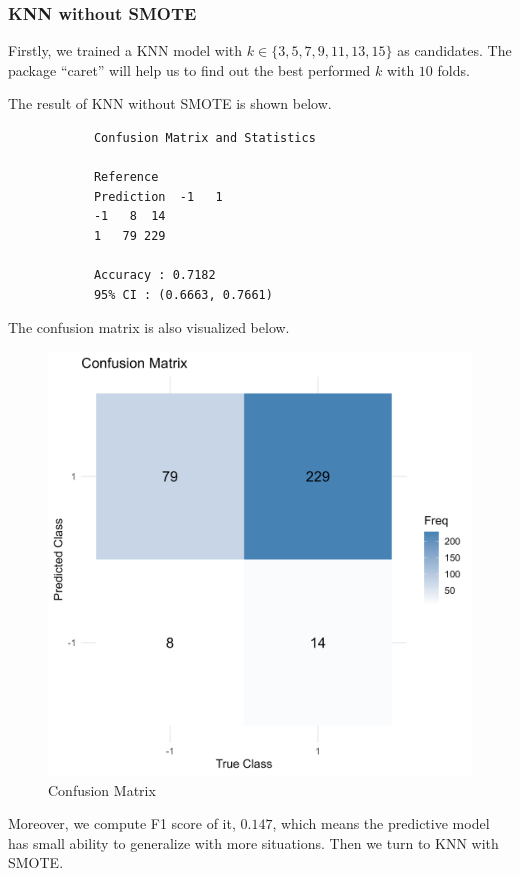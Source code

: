 \documentclass{article}
\begin{document}
	\subsubsection{KNN without SMOTE}
	\par Firstly, we trained a KNN model with $k\in\{3,5,7,9,11,13,15\}$ as candidates. The package ``caret'' will help us to find out the best performed $k$ with $10$ folds.
	\par The result of KNN without SMOTE is shown below.
		\begin{framed}
		\begin{verbatim}
			Confusion Matrix and Statistics
			
			Reference
			Prediction  -1   1
			-1   8  14
			1   79 229
			
			Accuracy : 0.7182          
			95% CI : (0.6663, 0.7661)
		\end{verbatim}
	\end{framed}
	The confusion matrix is also visualized below.
	\begin{figure}[htbp]
		\centering
		\includegraphics[scale = 0.3]{Pics/20}
		\caption{Confusion Matrix}
		\label{fig:20}
	\end{figure}
	\par Moreover, we compute F1 score of it, $0.147$, which means the predictive model has small ability to generalize with more situations. Then we turn to KNN with SMOTE.
\end{document}
